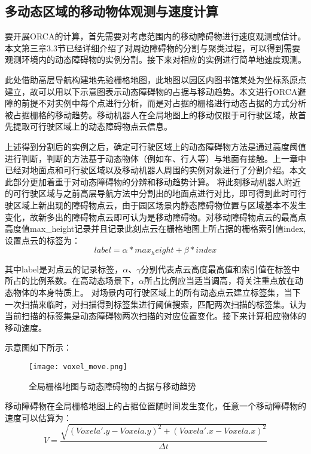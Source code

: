\subsection{多动态区域的移动物体观测与速度计算}
要开展ORCA的计算，首先需要对考虑范围内的移动障碍物进行速度观测或估计。本文第三章3.3节已经详细介绍了对周边障碍物的分割与聚类过程，可以得到需要观测环境内的动态障碍物的实例分割。接下来对相应的实例进行简单地速度观测。

此处借助高层导航构建地先验栅格地图，此地图以园区内图书馆某处为坐标系原点建立，故可以用以下示意图表示动态障碍物的占据与移动趋势。本文进行ORCA避障的前提不对实例中每个点进行分析，而是对占据的栅格进行动态占据的方式分析被占据栅格的移动趋势。移动机器人在全局地图上的移动仅限于可行驶区域，故首先提取可行驶区域上的动态障碍物点云信息。

上述得到分割后的实例之后，确定可行驶区域上的动态障碍物方法是通过高度阈值进行判断，判断的方法基于动态物体（例如车、行人等）与地面有接触。上一章中已经对地面点和可行驶区域以及移动机器人周围的实例对象进行了分割介绍。本文此部分更加着重于对动态障碍物的分辨和移动趋势计算。
将此刻移动机器人附近的可行驶区域与之前高层导航方法中分割出的地面点进行对比，即可得到此时可行驶区域上新出现的障碍物点云，由于园区场景内静态障碍物位置与区域基本不发生变化，故新多出的障碍物点云即可认为是移动障碍物。对移动障碍物点云的最高点高度值max\_height记录并且记录此刻点云在栅格地图上所占据的栅格索引值index,设置点云的标签为：
\begin{equation}
    label = \alpha * max_height + \beta * index
\end{equation}

其中label是对点云的记录标签，$\alpha $、$\gamma $分别代表点云高度最高值和索引值在标签中所占的比例系数。在高动态场景下，$\alpha $所占比例应当适当调高，将关注重点放在动态物体的本身特质上。
对场景内可行驶区域上的所有动态点云建立标签集，当下一次扫描来临时，对扫描得到标签集进行阈值搜索，匹配两次扫描的标签集。认为当前扫描的标签集是动态障碍物两次扫描的对应位置变化。接下来计算相应物体的移动速度。

示意图如下所示：

\begin{figure}[ht]
    \centering
    \texttt{[image: voxel\_move.png]}
    \caption{全局栅格地图与动态障碍物的占据与移动趋势}
\end{figure}
移动障碍物在全局栅格地图上的占据位置随时间发生变化，任意一个移动障碍物的速度可以估算为：
\begin{equation}
    V =  \frac{\sqrt{(Voxela'.y - Voxela.y)^2 + (Voxela'.x - Voxela.x)^2} }{\varDelta t}
\end{equation}

